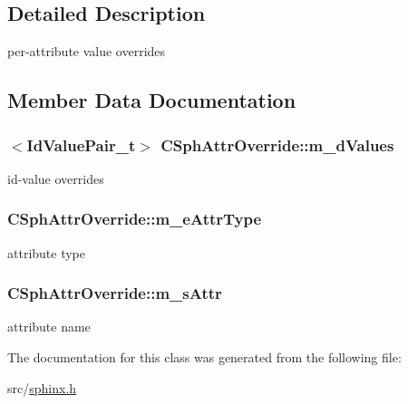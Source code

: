 \subsection{Detailed Description}
per-\/attribute value overrides 

\subsection{Member Data Documentation}
\hypertarget{classCSphAttrOverride_a6e4dbed6645cc989de28563748f09299}{
\subsubsection[{m\-\_\-d\-Values}]{$<${\bf Id\-Value\-Pair\-\_\-t}$>$ C\-Sph\-Attr\-Override\-::m\-\_\-d\-Values}}\label{classCSphAttrOverride_a6e4dbed6645cc989de28563748f09299}


id-\/value overrides 

\hypertarget{classCSphAttrOverride_a419e58c7300c784e43d7bbc2af646da6}{
\subsubsection[{m\-\_\-e\-Attr\-Type}]{ C\-Sph\-Attr\-Override\-::m\-\_\-e\-Attr\-Type}}\label{classCSphAttrOverride_a419e58c7300c784e43d7bbc2af646da6}


attribute type 

\hypertarget{classCSphAttrOverride_a045be0fe83269393a9a240744f9f839d}{
\subsubsection[{m\-\_\-s\-Attr}]{ C\-Sph\-Attr\-Override\-::m\-\_\-s\-Attr}}\label{classCSphAttrOverride_a045be0fe83269393a9a240744f9f839d}


attribute name 



The documentation for this class was generated from the following file\-:\begin{DoxyCompactItemize}
\item 
src/\hyperlink{sphinx_8h}{sphinx.\-h}\end{DoxyCompactItemize}
